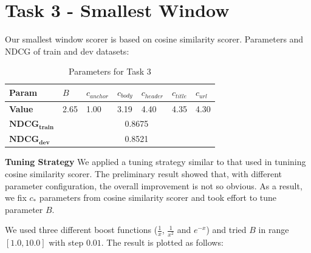 \documentclass{article}
\begin{document}
\section{Task 3 - Smallest Window}

Our smallest window scorer is based on cosine similarity scorer. Parameters and NDCG of train and dev datasets:

\begin{table}[!htb]
    \centering
    \begin{tabular}{ | l | l | l | l | l | l | l |}
    \hline
    \textbf{Param} & $B$ & $c_{anchor}$ & $c_{body}$ & $c_{header}$ & $c_{title}$ & $c_{url}$ \\
    \hline
    \textbf{Value} & 2.65 & 1.00 & 3.19 & 4.40 & 4.35 & 4.30 \\
    \hline
    $\mathbf{NDCG_{train}}$ & \multicolumn{6}{c|}{0.8675} \\
    \hline
    $\mathbf{NDCG_{dev}}$ & \multicolumn{6}{c|}{0.8521} \\
    \hline
    \end{tabular}
    \caption{Parameters for Task 3}
\end{table}

\textbf{Tuning Strategy} We applied a tuning strategy similar to that used in tunining cosine similarity scorer. The preliminary result showed that, with different parameter configuration, the overall improvement is not so obvious. As a result, we fix $c_*$ parameters from cosine similarity scorer and took effort to tune parameter $B$.

We used three different boost functions ($\frac{1}{x}$, $\frac{1}{x^2}$ and $e^{-x}$) and tried $B$ in range $[1.0, 10.0]$ with step $0.01$. The result is plotted as follows:
\end{document}
